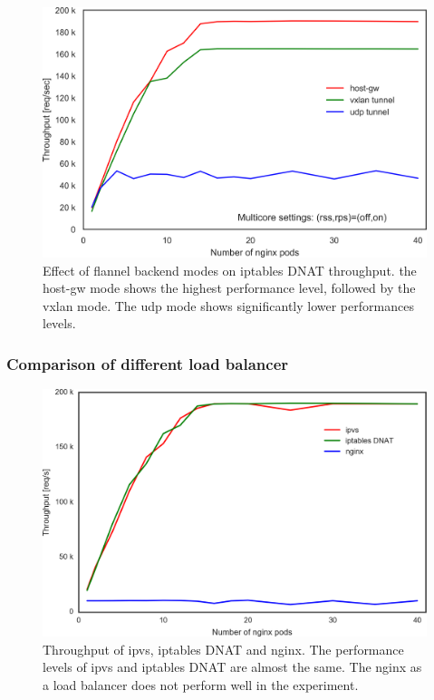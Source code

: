 \begin{figure}[h]
    \centering
    \includegraphics[width=0.75\columnwidth]{Figs/iptables_flannel_mode}

  \par\bigskip
  \centering
  \begin{minipage}{0.9\columnwidth}
    \caption[Effect of flannel backend modes on iptables DNAT throughput]{
      Effect of flannel backend modes on iptables DNAT throughput.
      the host-gw mode shows the highest performance level, followed by the vxlan mode.
      The udp mode shows significantly lower performances levels.
    }
    \label{fig:iptables_flannel_mode}
  \end{minipage}
\end{figure}

\FloatBarrier

\subsubsection{Comparison of different load balancer}

\begin{figure}[h]
  \centering
  \includegraphics[width=0.75\columnwidth]{Figs/ipvs-iptables-nginx}
  \par\bigskip
  \centering
  \begin{minipage}{0.9\columnwidth}
    \caption[Throughput of ipvs, iptables DNAT and nginx]{
      Throughput of ipvs, iptables DNAT and nginx.
      The performance levels of ipvs and iptables DNAT are almost the same.
      The nginx as a load balancer does not perform well in the experiment.
    }
    \label{fig:ipvs-iptables-nginx}
  \end{minipage}
\end{figure}


